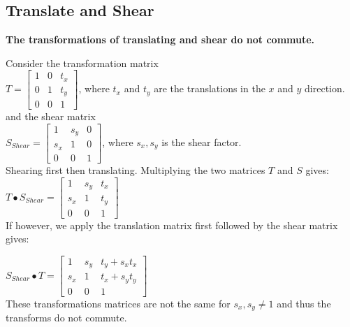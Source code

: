 \documentclass[a4paper,10pt]{scrartcl}
\begin{document}
\subsection{Translate and Shear}

{\bfseries The transformations of translating and shear do not commute.}

Consider the transformation matrix \\

$T = 
\begin{bmatrix}
    1       & 0 & t_x \\
    0       & 1 & t_y \\
    0       & 0 & 1 
\end{bmatrix}
$, where $t_x $ and $t_y$ are the translations in the $x$ and $y$ direction. \\

and the shear matrix \\

$S_{Shear} = \begin{bmatrix}
    1       & s_y & 0 \\
    s_x       & 1 & 0 \\
    0       & 0 & 1     
 \end{bmatrix}
$, where $s_x, s_y$ is the shear factor. \\

Shearing first then translating. Multiplying the two matrices $T$ and $S$ gives: \\

$T \bullet S_{Shear} = \begin{bmatrix}
		  1 & s_y & t_x \\
		  s_x & 1 & t_y \\
		  0 & 0 & 1
               \end{bmatrix}
$ \\

If however, we apply the translation matrix first followed by the shear matrix gives:

$S_{Shear} \bullet T = \begin{bmatrix}
		  1 & s_y & t_y + s_xt_x \\
		  s_x & 1 & t_x + s_yt_y \\
		  0 & 0 & 1
               \end{bmatrix}
$ \\

These transformations matrices are not the same for $s_x, s_y \neq 1$ and thus the transforms do not commute. \\ 
\end{document}
